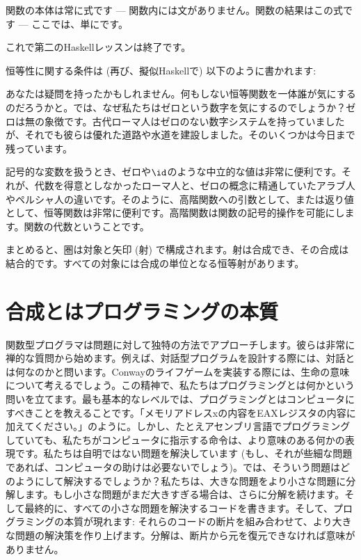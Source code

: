 関数の本体は常に式です --- 関数内には文がありません。関数の結果はこの式です --- ここでは、単にです。

これで第二のHaskellレッスンは終了です。

恒等性に関する条件は (再び、擬似Haskellで) 以下のように書かれます:

あなたは疑問を持ったかもしれません。何もしない恒等関数を一体誰が気にするのだろうかと。では、なぜ私たちはゼロという数字を気にするのでしょうか？ゼロは無の象徴です。古代ローマ人はゼロのない数字システムを持っていましたが、それでも彼らは優れた道路や水道を建設しました。そのいくつかは今日まで残っています。

記号的な変数を扱うとき、ゼロや$\id$のような中立的な値は非常に便利です。それが、代数を得意としなかったローマ人と、ゼロの概念に精通していたアラブ人やペルシャ人の違いです。そのように、高階関数への引数として、または返り値として、恒等関数は非常に便利です。高階関数は関数の記号的操作を可能にします。関数の代数ということです。

まとめると、圏は対象と矢印 (射) で構成されます。射は合成でき、その合成は結合的です。すべての対象には合成の単位となる恒等射があります。

\section{合成とはプログラミングの本質}

関数型プログラマは問題に対して独特の方法でアプローチします。彼らは非常に禅的な質問から始めます。例えば、対話型プログラムを設計する際には、対話とは何なのかと問います。Conwayのライフゲームを実装する際には、生命の意味について考えるでしょう。この精神で、私たちはプログラミングとは何かという問いを立てます。最も基本的なレベルでは、プログラミングとはコンピュータにすべきことを教えることです。「メモリアドレスxの内容をEAXレジスタの内容に加えてください。」のように。しかし、たとえアセンブリ言語でプログラミングしていても、私たちがコンピュータに指示する命令は、より意味のある何かの表現です。私たちは自明ではない問題を解決しています (もし、それが些細な問題であれば、コンピュータの助けは必要ないでしょう)。では、そういう問題はどのようにして解決するでしょうか？私たちは、大きな問題をより小さな問題に分解します。もし小さな問題がまだ大きすぎる場合は、さらに分解を続けます。そして最終的に、すべての小さな問題を解決するコードを書きます。そして、プログラミングの本質が現れます: それらのコードの断片を組み合わせて、より大きな問題の解決策を作り上げます。分解は、断片から元を復元できなければ意味がありません。

